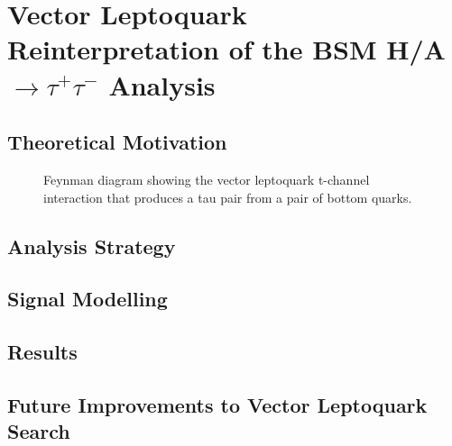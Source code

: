 \section{\texorpdfstring{Vector Leptoquark Reinterpretation of the BSM H/A $\rightarrow \tau^+\tau^-$ Analysis}{Vector Leptoquark Reinterpretation of the BSM H/A to tau tau Analysis}}
\label{sec:vector_leptoquark_reinterpretation}

\subsection{Theoretical Motivation}

\begin{figure}[H]
\centering
{}
\caption{Feynman diagram showing the vector leptoquark t-channel interaction that produces a tau pair from a pair of bottom quarks.}
\label{fig:leptoquark_feynman}
\end{figure}

\subsection{Analysis Strategy}

\subsection{Signal Modelling}

\subsection{Results}

\subsection{Future Improvements to Vector Leptoquark Search}